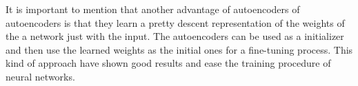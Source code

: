 \documentclass{article}
\begin{document}
It is important to mention that another advantage of autoencoders of autoencoders is that they learn a pretty descent representation of the weights of the a network just with the input. The autoencoders can be used as a initializer and then use the learned weights as the initial ones for a fine-tuning process. This kind of approach have shown good results and ease the training procedure of neural networks.

\printbibliography
\end{document}
